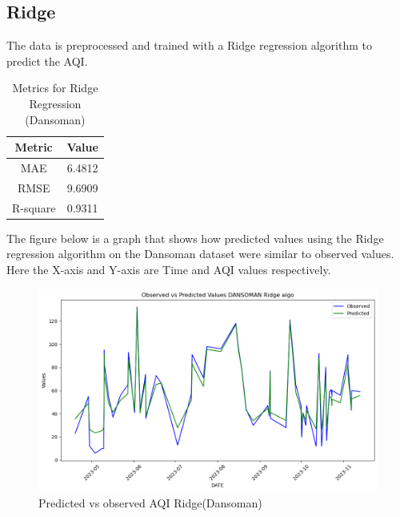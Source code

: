 \documentclass{book}
\numberwithin{equation}{section}
\numberwithin{figure}{section}
\begin{document}
\subsection{Ridge}
\vspace{-5mm} %
The data is preprocessed and trained with a Ridge regression algorithm to predict the AQI.
\begin{table}[H]
    \centering
    \begin{tabular}{|c|c|}
        \hline
        \textbf{Metric} & \textbf{Value} \\
        \hline
        MAE & 6.4812 \\
        \hline
        RMSE & 9.6909\\
        \hline
        R-square & 0.9311 \\
        \hline
    \end{tabular}
    \caption{Metrics for Ridge Regression (Dansoman)}
    \label{tab: Ridge metrics(Dansoman)}
\end{table}
The figure below is a graph that shows how predicted values using the Ridge regression algorithm on the Dansoman dataset were similar to observed values. Here the X-axis and Y-axis are Time and AQI values respectively.
\begin{figure}[H]
\centering 
       \includegraphics[width=\linewidth]{ridge dansoman.png}
        \caption{ Predicted vs observed AQI Ridge(Dansoman)}
        \label{fig: Ridge predicted vs observed AQI(Dansoman)}
\end{figure}
\end{document}
